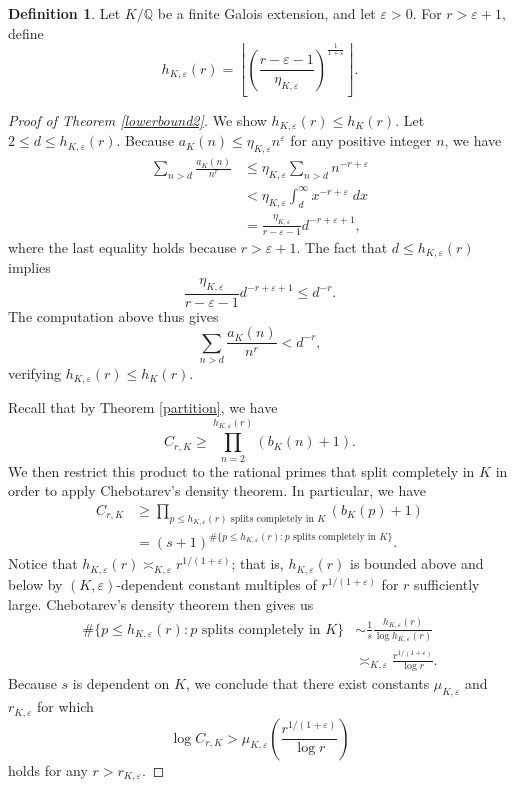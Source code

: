 \documentclass[12pt]{amsart}
\theoremstyle{definition}
\newtheorem{definition}[theorem]{Definition}
\numberwithin{equation}{section}
\newcommand{\Q}{\mathbb{Q}}
\begin{document}
\begin{definition}
    Let $K/\Q$ be a finite Galois extension, and let $\varepsilon > 0.$ For $r > \varepsilon + 1,$ define $$h_{K, \varepsilon}(r) = \left\lfloor \left( \frac{r-\varepsilon-1}{\eta_{K,\varepsilon}} \right)^{\frac{1}{1+\varepsilon}} \right\rfloor.$$
\end{definition}

\begin{proof}[Proof of Theorem \ref{lowerbound2}]
    We show $h_{K, \varepsilon}(r) \leq h_K(r).$ Let $2 \leq d \leq h_{K, \varepsilon}(r).$ Because $a_K(n) \leq \eta_{K, \varepsilon}n^\varepsilon$ for any positive integer $n$, we have \begin{align*}
        \sum_{n > d} \frac{a_K(n)}{n^r} &\leq \eta_{K, \varepsilon} \sum_{n > d} n^{-r + \varepsilon} \\
        &< \eta_{K, \varepsilon}\int_d^\infty x^{-r+\varepsilon} \; dx \\
        &= \frac{\eta_{K, \varepsilon}}{r-\varepsilon-1} d^{-r+\varepsilon+1},
    \end{align*} where the last equality holds because $r > \varepsilon + 1.$ The fact that $d \leq h_{K, \varepsilon}(r)$ implies $$\frac{\eta_{K, \varepsilon}}{r-\varepsilon-1} d^{-r + \varepsilon + 1} \leq d^{-r}.$$ The computation above thus gives $$\sum_{n > d} \frac{a_K(n)}{n^r} < d^{-r},$$ verifying $h_{K, \varepsilon}(r) \leq h_K(r).$

    Recall that by Theorem \ref{partition}, we have $$C_{r,K} \geq \prod_{n=2}^{h_{K,\varepsilon}(r)} (b_K(n) + 1).$$ We then restrict this product to the rational primes that split completely in $K$ in order to apply Chebotarev's density theorem. In particular, we have \begin{align*}
        C_{r,K} &\geq \prod_{p \leq h_{K, \varepsilon}(r) \text{ splits completely in }K} (b_K(p) + 1) \\
        &= (s+1)^{\#\{ p \leq h_{K, \varepsilon}(r) : p \text{ splits completely in }K\}}.
    \end{align*} Notice  that $h_{K, \varepsilon}(r) \asymp_{K,\varepsilon} r^{1/ (1 + \varepsilon)}$; that is, $h_{K,\varepsilon}(r)$ is bounded above and below by $(K,\varepsilon)$-dependent constant multiples of $r^{1/(1+\varepsilon)}$ for $r$ sufficiently large.
    Chebotarev's density theorem then gives us 
    \begin{align*}
        \#\{ p \leq h_{K, \varepsilon}(r) : p \text{ splits completely in }K\} &\sim \frac{1}{s} \frac{h_{K,\varepsilon}(r)}{\log h_{K, \varepsilon}(r)} \\
        &\asymp_{K,\varepsilon} \frac{r^{1/(1+ \varepsilon)}}{\log r}.
    \end{align*} Because $s$ is dependent on $K$, we conclude that there exist constants $\mu_{K,\varepsilon}$ and $r_{K,\varepsilon}$ for which $$\log C_{r,K} > \mu_{K,\varepsilon} \left( \frac{r^{1/(1+ \varepsilon)}}{\log r} \right)$$ holds for any $r > r_{K,\varepsilon}.$
\end{proof}
\end{document}
